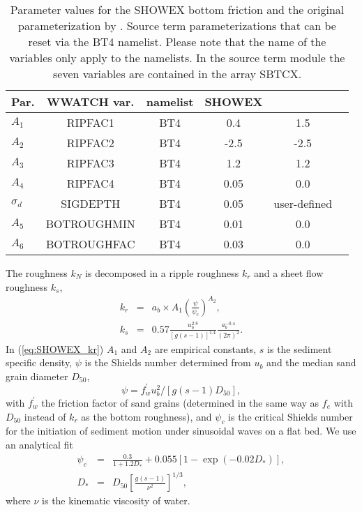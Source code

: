 \begin{table} \begin{center}
\begin{tabular}{|l|c|c|c|c|c|} \hline \hline
Par.         &  WWATCH var.           & namelist &  SHOWEX  &  \cite{tol:JPO94} \\
\hline
  $A_1$ &  RIPFAC1                    & BT4 & 0.4     & 1.5    \\
  $A_2$ &  RIPFAC2                    & BT4 & -2.5    & -2.5   \\
  $A_3$ &  RIPFAC3                    & BT4 & 1.2     & 1.2     \\
  $A_4$ &  RIPFAC4                    & BT4 & 0.05    & 0.0     \\
  $\sigma_d$ &  SIGDEPTH              & BT4 & 0.05    & user-defined  \\
  $A_5$ &  BOTROUGHMIN                & BT4 & 0.01    & 0.0     \\
  $A_6$ &  BOTROUGHFAC                & BT4 & 0.03    & 0.0     \\
\hline
\end{tabular} \end{center}
\caption{Parameter values for the SHOWEX bottom friction and the original 
  parameterization by \cite{tol:JPO94}. Source term
  parameterizations that can be reset via the BT4 namelist. Please
  note that the name of the variables only apply to the namelists. In the source
  term module the seven variables are contained in the array SBTCX. } \label{tab:BT4}
\botline
\end{table}

The roughness $k_{N}$ is decomposed in a ripple roughness $k_{r}$ and
a sheet flow roughness $k_{s}$,
\begin{eqnarray}
k_{r} &=&a_{b}\times A_{1}\left( \frac{\psi }{\psi _{c}}\right) ^{A_{2}}, \label{eq:SHOWEX_kr}\\
k_{s} &=&0.57\frac{u_{b}^{2.8}}{\left[ g\left( s-1\right) \right] ^{1.4}}%
\frac{a_{b}^{-0.4}}{\left( 2\pi \right) ^{2}}.
\end{eqnarray}
In (\ref{eq:SHOWEX_kr}) $A_1$ and $A_2$ are empirical constants, $s$ is the
sediment specific density, $\psi$ is the Shields number determined from $u_b$
and the median sand grain diameter $D_{50}$,
\begin{equation}
\psi =f_{w}^{\prime }u_{b}^{2}/\left[g\left( s-1\right) D_{50}\right],
\end{equation}
with $f_{w}^{\prime }$ the friction factor of sand grains (determined in the
same way as $f_e$ with $D_{50}$ instead of $k_r$ as the bottom roughness), and
$\psi _{c}$ is the critical Shields number for the initiation of sediment
motion under sinusoidal waves on a flat bed.  We use an analytical fit
\citep{bk:Soul97}
\begin{eqnarray}
\psi _{c} &=&\frac{0.3}{1+1.2D_{*}}+0.055\left[ 1-\exp \left(
-0.02D_{*}\right) \right]\label{Soulsby_psic} , \\
D_{*} &=&D_{50}\left[ \frac{g\left( s-1\right) }{\nu ^{2}}\right] ^{1/3},
\end{eqnarray}
where $\nu $ is the kinematic viscosity of water. 


